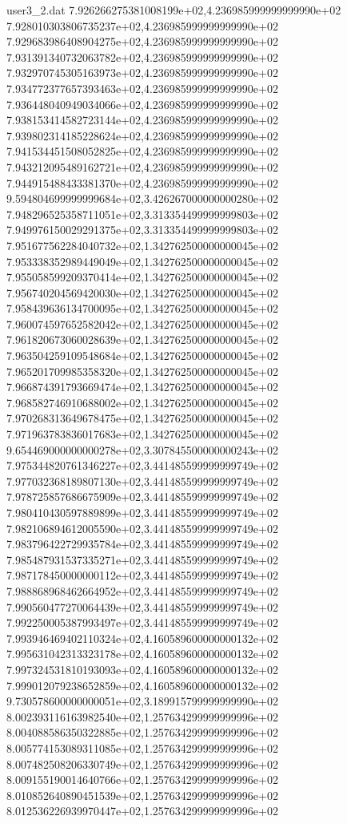 \begin{filecontents}{user3_2.dat}
7.926266275381008199e+02,4.236985999999999990e+02
7.928010303806735237e+02,4.236985999999999990e+02
7.929683986408904275e+02,4.236985999999999990e+02
7.931391340732063782e+02,4.236985999999999990e+02
7.932970745305163973e+02,4.236985999999999990e+02
7.934772377657393463e+02,4.236985999999999990e+02
7.936448040949034066e+02,4.236985999999999990e+02
7.938153414582723144e+02,4.236985999999999990e+02
7.939802314185228624e+02,4.236985999999999990e+02
7.941534451508052825e+02,4.236985999999999990e+02
7.943212095489162721e+02,4.236985999999999990e+02
7.944915488433381370e+02,4.236985999999999990e+02
9.594804699999999684e+02,3.426267000000000280e+02
7.948296525358711051e+02,3.313354499999999803e+02
7.949976150029291375e+02,3.313354499999999803e+02
7.951677562284040732e+02,1.342762500000000045e+02
7.953338352989449049e+02,1.342762500000000045e+02
7.955058599209370414e+02,1.342762500000000045e+02
7.956740204569420030e+02,1.342762500000000045e+02
7.958439636134700095e+02,1.342762500000000045e+02
7.960074597652582042e+02,1.342762500000000045e+02
7.961820673060028639e+02,1.342762500000000045e+02
7.963504259109548684e+02,1.342762500000000045e+02
7.965201709985358320e+02,1.342762500000000045e+02
7.966874391793669474e+02,1.342762500000000045e+02
7.968582746910688002e+02,1.342762500000000045e+02
7.970268313649678475e+02,1.342762500000000045e+02
7.971963783836017683e+02,1.342762500000000045e+02
9.654469000000000278e+02,3.307845500000000243e+02
7.975344820761346227e+02,3.441485599999999749e+02
7.977032368189807130e+02,3.441485599999999749e+02
7.978725857686675909e+02,3.441485599999999749e+02
7.980410430597889899e+02,3.441485599999999749e+02
7.982106894612005590e+02,3.441485599999999749e+02
7.983796422729935784e+02,3.441485599999999749e+02
7.985487931537335271e+02,3.441485599999999749e+02
7.987178450000000112e+02,3.441485599999999749e+02
7.988868968462664952e+02,3.441485599999999749e+02
7.990560477270064439e+02,3.441485599999999749e+02
7.992250005387993497e+02,3.441485599999999749e+02
7.993946469402110324e+02,4.160589600000000132e+02
7.995631042313323178e+02,4.160589600000000132e+02
7.997324531810193093e+02,4.160589600000000132e+02
7.999012079238652859e+02,4.160589600000000132e+02
9.730578600000000051e+02,3.189915799999999990e+02
8.002393116163982540e+02,1.257634299999999996e+02
8.004088586350322885e+02,1.257634299999999996e+02
8.005774153089311085e+02,1.257634299999999996e+02
8.007482508206330749e+02,1.257634299999999996e+02
8.009155190014640766e+02,1.257634299999999996e+02
8.010852640890451539e+02,1.257634299999999996e+02
8.012536226939970447e+02,1.257634299999999996e+02

\end{filecontents}
